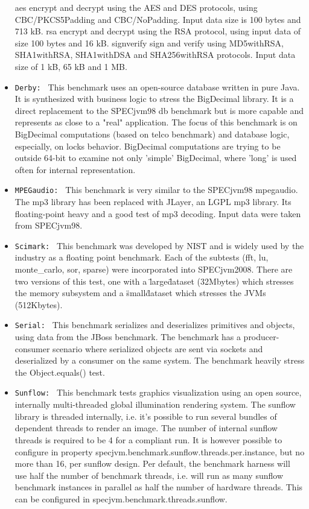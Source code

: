 \begin{itemize}
    aes encrypt and decrypt using the AES and DES protocols, using CBC/PKCS5Padding and CBC/NoPadding. Input data size is 100 bytes and 713 kB.
    rsa encrypt and decrypt using the RSA protocol, using input data of size 100 bytes and 16 kB.
    signverify sign and verify using MD5withRSA, SHA1withRSA, SHA1withDSA and SHA256withRSA protocols. Input data size of 1 kB, 65 kB and 1 MB.
\item \texttt{Derby: } This benchmark uses an open-source database written in pure Java. It is synthesized with business logic to stress the BigDecimal library. It is a direct replacement to the SPECjvm98 db benchmark but is more capable and represents as close to a "real" application. The focus of this benchmark is on BigDecimal computations (based on telco benchmark) and database logic, especially, on locks behavior. BigDecimal computations are trying to be outside 64-bit to examine not only 'simple' BigDecimal, where 'long' is used often for internal representation. 
\item \texttt{MPEGaudio: } This benchmark is very similar to the SPECjvm98 mpegaudio. The mp3 library has been replaced with JLayer, an LGPL mp3 library. Its floating-point heavy and a good test of mp3 decoding. Input data were taken from SPECjvm98.
\item \texttt{Scimark: } This benchmark was developed by NIST and is widely used by the industry as a floating point benchmark. Each of the subtests (fft, lu, monte\_carlo, sor, sparse) were incorporated into SPECjvm2008. There are two versions of this test, one with a \"large\" dataset (32Mbytes) which stresses the memory subsystem and a \"small\" dataset which stresses the JVMs (512Kbytes).
\item \texttt{Serial: } This benchmark serializes and deserializes primitives and objects, using data from the JBoss benchmark. The benchmark has a producer-consumer scenario where serialized objects are sent via sockets and deserialized by a consumer on the same system. The benchmark heavily stress the Object.equals() test.
\item \texttt{Sunflow: } This benchmark tests graphics visualization using an open source, internally multi-threaded global illumination rendering system. The sunflow library is threaded internally, i.e. it's possible to run several bundles of dependent threads to render an image. The number of internal sunflow threads is required to be 4 for a compliant run. It is however possible to configure in property specjvm.benchmark.sunflow.threads.per.instance, but no more than 16, per sunflow design. Per default, the benchmark harness will use half the number of benchmark threads, i.e. will run as many sunflow benchmark instances in parallel as half the number of hardware threads. This can be configured in specjvm.benchmark.threads.sunflow.

\end{itemize}
